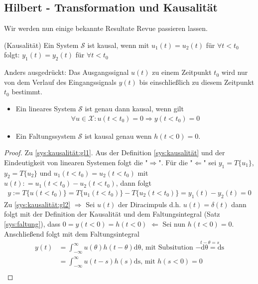 \subsection{Hilbert - Transformation und Kausalität}
Wir werden nun einige bekannte Resultate Revue passieren lassen.
\begin{defi}(Kausalität)\label{sys:kausalität}
Ein System $\mathscr{S}$ ist kausal, wenn mit $u_1(t) = u_2(t)$ für $\forall t< t_0$ folgt: $y_1(t) = y_2(t)$ für $\forall t< t_0$  
\end{defi}
\begin{bem}
Anders ausgedrückt: Das Ausgangssignal $u(t)$ zu einem Zeitpunkt $t_0$ wird nur von dem Verlauf des Eingangssignals $y(t)$ bis einschließlich zu diesem Zeitpunkt $t_0$ bestimmt.
\end{bem}
\begin{satz} \label{sys:kausalität:lti}
\begin{itemize}
	\item \label{sys:kausalität:gl1} Ein lineares System $\mathscr{S}$ ist genau dann kausal, wenn gilt
	\begin{align}
		\forall u \in \mathscr{X}:  u(t < t_0) = 0 \Rightarrow y(t < t_0) = 0
	\end{align}
	\item \label{sys:kausalität:gl2}	Ein Faltungssystem $\mathscr{S}$ ist kausal genau wenn $h(t < 0) = 0$. 
\end{itemize}
\begin{proof}
Zu \ref{sys:kausalität:gl1}. Aus der Definition \ref{sys:kausalität} und der Eindeutigkeit von linearen Systemen folgt die "$\Rightarrow$". Für die "$\Leftarrow$" sei $y_1 = T\{u_1\}$, $y_2 = T\{u_2\}$ und $u_1(t < t_0)  = u_2(t < t_0)$ mit $u(t): =u_1(t < t_0) - u_2(t < t_0)$, dann folgt
\begin{align}
	y := T\{u(t < t_0)\}  = T\{u_1(t < t_0)\} - T\{u_2(t < t_0)\} = y_1(t) - y_2(t) = 0
\end{align}
Zu \ref{sys:kausalität:gl2} $\Rightarrow$ Sei $u(t)$ der Diracimpuls d.h. $u(t) = \delta(t)$ dann folgt mit der Definition der Kausalität und dem Faltungsintegral (Satz \ref{sys:faltung}), dass $0 = y(t < 0) = h(t< 0)$
$\Leftarrow$ Sei nun $h(t < 0) = 0$. Anschließend folgt mit dem Faltungsintegral
\begin{align}
	y(t) &= \int_{-\infty}^{\infty} u(\theta) h(t - \theta) \mathrm{d\theta} \text{, mit Subsitution } \stackrel{t - \theta = s}{-\mathrm{d\theta} = \mathrm{ds}}\\
	&= \int_{-\infty}^{\infty} u(t - s) h(s) \mathrm{ds} \text{, mit } h(s < 0) = 0\\

\end{align}
\end{proof}
\end{satz}
